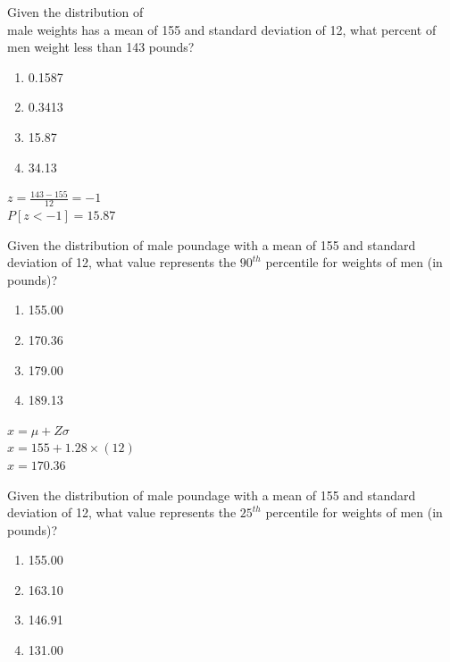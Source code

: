 \documentclass[11pt, chapterprefix=true]{scrbook}\usepackage[]{graphicx}\usepackage[]{color}
\begin{document}
\begin{exercises}
\begin{exercise}
    Given the distribution of \\ male weights has a mean of 155 and standard deviation of 12, what percent
of men weight less than 143 pounds?

	  \begin{enumerate}
	  \item 0.1587
	  \item 0.3413
	  \item 15.87
	  \item 34.13
	  \end{enumerate}
	  \vspace{2mm}
	\end{exercise}
	\begin{solution}   %

	    $z = \frac{143 - 155}{12} = -1$ \\
	    $P[z < -1] = 15.87$

	\end{solution}


  \begin{exercise} %

    Given the distribution of male poundage with a mean of 155 and standard deviation of 12, what value
represents the $90^{th}$ percentile for weights of men (in \\ pounds)?
	  \begin{enumerate}
	   \item 155.00
	  \item 170.36
	  \item 179.00
	  \item 189.13
	  \end{enumerate}
	  \vspace{2mm}
    
	\end{exercise}
	\begin{solution}  %

	    $x = \mu + Z \sigma$ \\
	    $x = 155 + 1.28 \times (12) $ \\
	    $x = 170.36$

  \end{solution}

  \begin{exercise} %

    Given the distribution of male poundage with a mean of 155 and standard deviation of 12, what value
represents the $25^{th}$ percentile for weights of men (in \\ pounds)?
	  \begin{enumerate}
	   \item 155.00
	  \item 163.10
	  \item 146.91
	  \item 131.00
	  \end{enumerate}
	  \vspace{2mm}
    

\end{exercise}
\end{exercises}
\end{document}
